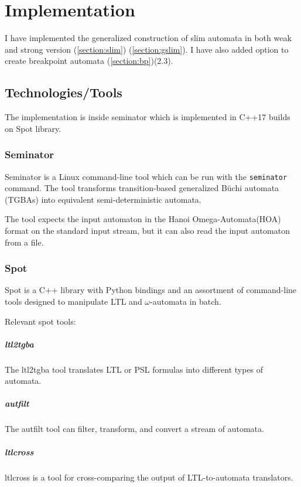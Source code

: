 \documentclass[
	digital,
nolof, nolot
]{fithesis3}
\begin{document}
			
	\chapter{Implementation}
		I have implemented the generalized construction of slim automata in both weak and strong version  (\ref{section:slim}) (\ref{section:gslim}). I have also added option to create breakpoint automata (\ref{section:bp})(2.3).
		
		\section{Technologies/Tools}
		The implementation is inside seminator which is implemented in C++17 builds on Spot library. %
		\subsection{Seminator} 
		Seminator is a Linux command-line tool which can be run with the \texttt{seminator} command. The tool transforms transition-based generalized Büchi automata (TGBAs) into equivalent semi-deterministic automata. \cite{Klokočka2017thesis}\cite{seminator}\cite{seminator2}
		
		
		
		The tool expects the input automaton in the Hanoi Omega-Automata(HOA) format \cite{DBLP:conf/cav/BabiakBDKKM0S15} on the standard input stream, but it can also read the input automaton from a file.
		
	\subsection{Spot}
	Spot is a C++ library with Python bindings and an assortment of command-line tools designed to manipulate LTL and $\omega$-automata in batch. \cite{spot2}
	
	Relevant spot tools:
	\paragraph{ltl2tgba} The ltl2tgba tool translates LTL or PSL formulas into different types of automata. \cite{ltl2tgba}
	\paragraph{autfilt} The autfilt tool can filter, transform, and convert a stream of automata. \cite{autfilt}
	\paragraph{ltlcross} ltlcross is a tool for cross-comparing the output of LTL-to-automata translators. \cite{ltlcross}
\end{document}
